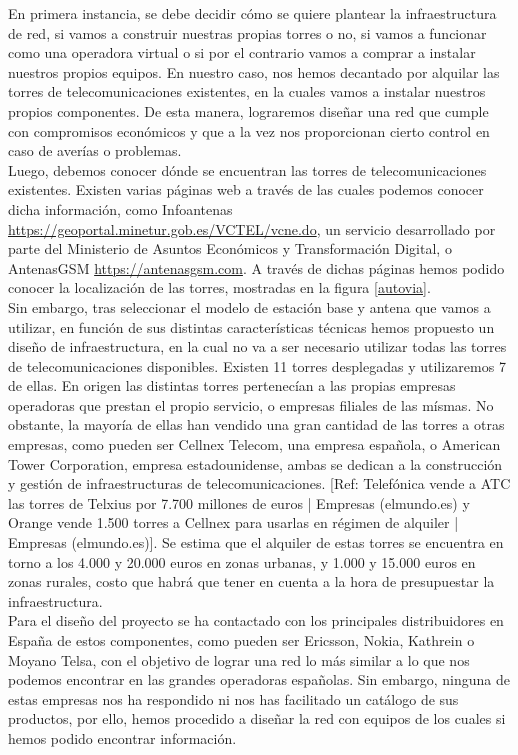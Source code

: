 En primera instancia, se debe decidir cómo se quiere plantear la infraestructura de red, si vamos a construir nuestras propias torres o no, si vamos a funcionar como una operadora virtual o si por el contrario vamos a comprar a instalar nuestros propios equipos. En nuestro caso, nos hemos decantado por alquilar las torres de telecomunicaciones existentes, en la cuales vamos a instalar nuestros propios componentes. De esta manera, lograremos diseñar una red que cumple con compromisos económicos y que a la vez nos proporcionan cierto control en caso de averías o problemas.\\

Luego, debemos conocer dónde se encuentran las torres de telecomunicaciones existentes. Existen varias páginas web a través de las cuales podemos conocer dicha información, como Infoantenas \url{https://geoportal.minetur.gob.es/VCTEL/vcne.do}, un servicio desarrollado por parte del Ministerio de Asuntos Económicos y Transformación Digital, o AntenasGSM \url{https://antenasgsm.com}. A través de dichas páginas hemos podido conocer la localización de las torres, mostradas en la figura \ref{autovia}.\\

Sin embargo, tras seleccionar el modelo de estación base y antena que vamos a utilizar, en función de sus distintas características técnicas hemos propuesto un diseño de infraestructura, en la cual no va a ser necesario utilizar todas las torres de telecomunicaciones disponibles. Existen 11 torres desplegadas y utilizaremos 7 de ellas. En origen las distintas torres pertenecían a las propias empresas operadoras que prestan el propio servicio, o empresas filiales de las mísmas. No obstante, la mayoría de ellas han vendido una gran cantidad de las torres a otras empresas, como pueden ser Cellnex Telecom, una empresa española, o American Tower Corporation, empresa estadounidense, ambas se dedican a la construcción y gestión de infraestructuras de telecomunicaciones. [Ref: Telefónica vende a ATC las torres de Telxius por 7.700 millones de euros | Empresas (elmundo.es) y Orange vende 1.500 torres a Cellnex para usarlas en régimen de alquiler | Empresas (elmundo.es)]. Se estima que el alquiler de estas torres se encuentra en torno a los 4.000 y 20.000 euros en zonas urbanas, y 1.000 y 15.000 euros en zonas rurales, costo que habrá que tener en cuenta a la hora de presupuestar la infraestructura.\\

Para el diseño del proyecto se ha contactado con los principales distribuidores en España de estos componentes, como pueden ser Ericsson, Nokia, Kathrein o Moyano Telsa, con el objetivo de lograr una red lo más similar a lo que nos podemos encontrar en las grandes operadoras españolas. Sin embargo, ninguna de estas empresas nos ha respondido ni nos has facilitado un catálogo de sus productos, por ello, hemos procedido a diseñar la red con equipos de los cuales si hemos podido encontrar información. \\

